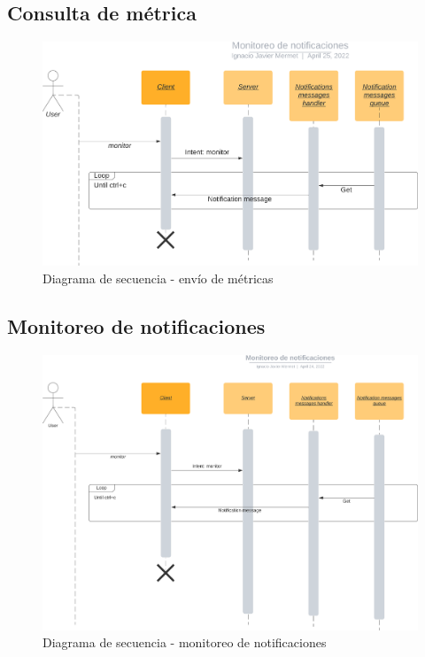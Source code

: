 \documentclass[a4paper,oneside]{article}
\begin{document}
\subsection{Consulta de métrica}
\begin{figure}[H]
\centering
\includegraphics[width=\textwidth]{images/query.png}
\caption{Diagrama de secuencia - envío de métricas}
\end{figure}

\subsection{Monitoreo de notificaciones}
\begin{figure}[H]
\centering
\includegraphics[width=\textwidth]{images/notificaciones.png}
\caption{Diagrama de secuencia - monitoreo de notificaciones}
\end{figure}
\end{document}
